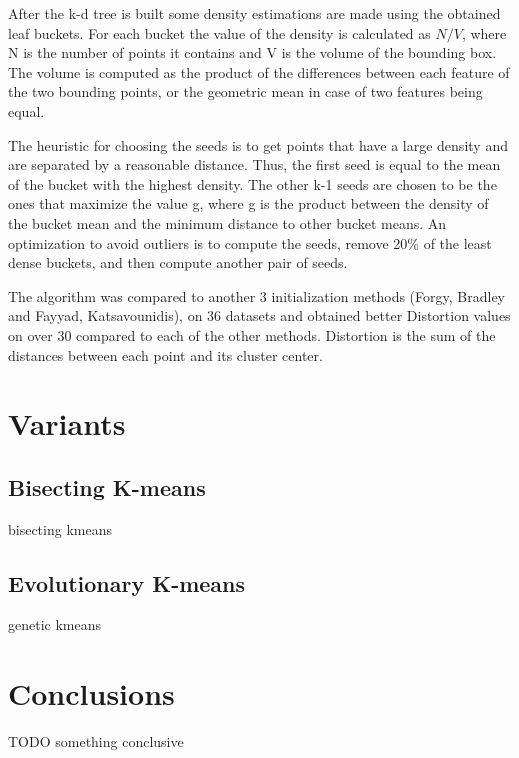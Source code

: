 \documentclass[12pt]{article}
\begin{document}
	After the k-d tree is built some density estimations are made using the obtained leaf buckets. For each bucket the value of the density is calculated as \( N / V \), where N is the number of points it contains and V is the volume of the bounding box. The volume is computed as the product of the differences between each feature of the two bounding points, or the geometric mean in case of two features being equal. 
	
	The heuristic for choosing the seeds is to get points that have a large density and are separated by a reasonable distance. Thus, the first seed is equal to the mean of the bucket with the highest density. The other k-1 seeds are chosen to be the ones that maximize the value g, where g is the product between the density of the bucket mean and the minimum distance to other bucket means. An optimization to avoid outliers is to compute the seeds, remove 20\% of the least dense buckets, and then compute another pair of seeds.
	
	The algorithm was compared to another 3 initialization methods (Forgy, Bradley and Fayyad, Katsavounidis), on 36 datasets and obtained better Distortion values on over 30 compared to each of the other methods. Distortion is the sum of the distances between each point and its cluster center.
	
	\section{Variants}
	\subsection{Bisecting K-means} 
	bisecting kmeans
	
	\subsection{Evolutionary K-means }
	genetic kmeans
	
	
	\section{Conclusions}
	TODO something conclusive
	
	\newpage
	
	
\end{document}
